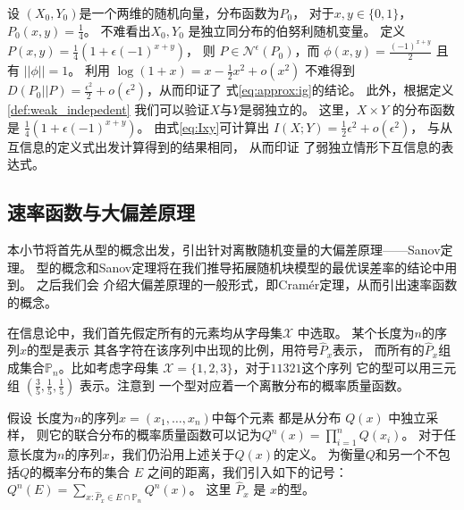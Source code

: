 \begin{example}\label{ex:Pweak_1}
设 $(X_0,Y_0)$是一个两维的随机向量，分布函数为$P_0$，
对于$x,y \in \{0,1\}$，
$P_0(x,y)=\frac{1}{4}$。
不难看出$X_0,Y_0$
是独立同分布的伯努利随机变量。
定义 $P(x,y)=\frac{1}{4}(1+\epsilon (-1)^{x+y})$，
则 $P\in \mathscr{N}^{\epsilon}(P_0)$，而
$\phi(x,y) = \frac{(-1)^{x+y}}{2}$
且有 $||\phi||=1$。
利用 $\log(1+x) = x - \frac{1}{2}x^2 + o(x^2)$
不难得到 $D(P_0||P)=\frac{\epsilon^2}{2}
+o(\epsilon^2)$，从而印证了
式\eqref{eq:approx:ig}的结论。
此外，根据定义 \ref{def:weak_indepedent} 
我们可以验证$X$与$Y$是弱独立的。
这里，$X\times Y$ 的分布函数是 $\frac{1}{4}(1+\epsilon (-1)^{x+y})$。
由式\eqref{eq:Ixy}可计算出
$I(X;Y)=\frac{1}{2}\epsilon^2+o(\epsilon^2)$，
与从互信息的定义式出发计算得到的结果相同，
从而印证
了弱独立情形下互信息的表达式。
\end{example}

\subsection{速率函数与大偏差原理}
本小节将首先从型的概念出发，引出针对离散随机变量的大偏差原理——Sanov定理。
型的概念和Sanov定理将在我们推导拓展随机块模型的最优误差率的结论中用到。
之后我们会
介绍大偏差原理的一般形式，即Cramér定理，从而引出速率函数的概念。

在信息论中，我们首先假定所有的元素均从字母集$\mathcal{X}$
中选取。
某个长度为$n$的序列$x$的型是表示
其各字符在该序列中出现的比例，用符号$\hat{P}_x$表示，
而所有的$\hat{P}_x$组成集合$\mathbb{P}_n$。比如考虑字母集
$\mathcal{X}=\{1,2,3\}$，对于$11321$这个序列
它的型可以用三元组 $(\frac{3}{5}, 
\frac{1}{5}, \frac{1}{5})$ 表示。注意到
一个型对应着一个离散分布的概率质量函数。

假设 长度为$n$的序列$x=(x_1,\dots, x_n)$中每个元素 都是从分布 $Q(x)$
中独立采样，
则它的联合分布的概率质量函数可以记为$Q^n(x)=\prod_{i=1}^n Q(x_i)$。
对于任意长度为$n$的序列$x$，我们仍沿用上述关于$Q(x)$的定义。
为衡量$Q$和另一个不包括$Q$的概率分布的集合 $E$ 之间的距离，我们引入如下的记号：
$Q^n(E) = \sum_{x: \hat{P}_x \in E \cap \mathbb{P}_n} Q^n(x)$。
这里 $\hat{P}_x$ 是 $x$的型。


